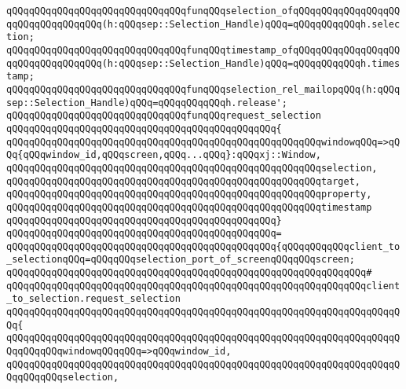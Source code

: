 \verb|qQQqqQQqqQQqqQQqqQQqqQQqqQQqqQQqfunqQQqselection_ofqQQqqQQqqQQqqQQqqQQqqQQqqQQqqQQqqQQq(h:qQQqsep::Selection_Handle)qQQq=qQQqqQQqqQQqh.selection;|\newline
\verb|qQQqqQQqqQQqqQQqqQQqqQQqqQQqqQQqfunqQQqtimestamp_ofqQQqqQQqqQQqqQQqqQQqqQQqqQQqqQQqqQQq(h:qQQqsep::Selection_Handle)qQQq=qQQqqQQqqQQqh.timestamp;|\newline
\verb|qQQqqQQqqQQqqQQqqQQqqQQqqQQqqQQqfunqQQqselection_rel_mailopqQQq(h:qQQqsep::Selection_Handle)qQQq=qQQqqQQqqQQqh.release';|\newline
\newline
\newline
\verb|qQQqqQQqqQQqqQQqqQQqqQQqqQQqqQQqfunqQQqrequest_selection|\newline
\verb|qQQqqQQqqQQqqQQqqQQqqQQqqQQqqQQqqQQqqQQqqQQqqQQq{|\newline
\verb|qQQqqQQqqQQqqQQqqQQqqQQqqQQqqQQqqQQqqQQqqQQqqQQqqQQqqQQqwindowqQQq=>qQQq{qQQqwindow_id,qQQqscreen,qQQq...qQQq}:qQQqxj::Window,|\newline
\verb|qQQqqQQqqQQqqQQqqQQqqQQqqQQqqQQqqQQqqQQqqQQqqQQqqQQqqQQqselection,|\newline
\verb|qQQqqQQqqQQqqQQqqQQqqQQqqQQqqQQqqQQqqQQqqQQqqQQqqQQqqQQqtarget,|\newline
\verb|qQQqqQQqqQQqqQQqqQQqqQQqqQQqqQQqqQQqqQQqqQQqqQQqqQQqqQQqproperty,|\newline
\verb|qQQqqQQqqQQqqQQqqQQqqQQqqQQqqQQqqQQqqQQqqQQqqQQqqQQqqQQqtimestamp|\newline
\verb|qQQqqQQqqQQqqQQqqQQqqQQqqQQqqQQqqQQqqQQqqQQqqQQq}|\newline
\verb|qQQqqQQqqQQqqQQqqQQqqQQqqQQqqQQqqQQqqQQqqQQqqQQq=|\newline
\verb|qQQqqQQqqQQqqQQqqQQqqQQqqQQqqQQqqQQqqQQqqQQqqQQq{qQQqqQQqqQQqclient_to_selectionqQQq=qQQqqQQqselection_port_of_screenqQQqqQQqscreen;|\newline
\verb|qQQqqQQqqQQqqQQqqQQqqQQqqQQqqQQqqQQqqQQqqQQqqQQqqQQqqQQqqQQqqQQq#|\newline
\verb|qQQqqQQqqQQqqQQqqQQqqQQqqQQqqQQqqQQqqQQqqQQqqQQqqQQqqQQqqQQqqQQqclient_to_selection.request_selection|\newline
\verb|qQQqqQQqqQQqqQQqqQQqqQQqqQQqqQQqqQQqqQQqqQQqqQQqqQQqqQQqqQQqqQQqqQQqqQQq{|\newline
\verb|qQQqqQQqqQQqqQQqqQQqqQQqqQQqqQQqqQQqqQQqqQQqqQQqqQQqqQQqqQQqqQQqqQQqqQQqqQQqqQQqwindowqQQqqQQq=>qQQqwindow_id,|\newline
\verb|qQQqqQQqqQQqqQQqqQQqqQQqqQQqqQQqqQQqqQQqqQQqqQQqqQQqqQQqqQQqqQQqqQQqqQQqqQQqqQQqselection,|\newline
